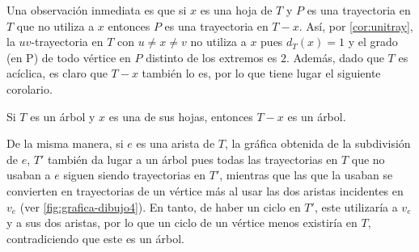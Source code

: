 Una observaci\'on inmediata es que si $x$ es una hoja de $T$ y $P$ es una
trayectoria en $T$ que no utiliza a $x$ entonces $P$ es una trayectoria en
$T-x$. As\'i, por \cref{cor:unitray}, la $uv$-trayectoria en $T$ con $u\neq
x\neq v$ no utiliza a $x$ pues $d_T(x)=1$ y el grado (en P) de todo v\'ertice en
$P$ distinto de los extremos es $2$. Adem\'as, dado que $T$ es ac\'iclica, es
claro que $T-x$ tambi\'en lo es, por lo que tiene lugar el siguiente corolario.

\begin{corolario}
\label{cor:eliminacion-arbol}
  Si $T$ es un \'arbol y $x$ es una de sus hojas, entonces $T-x$ es un \'arbol.
\end{corolario}

De la misma manera, si $e$ es una arista de $T$, la gr\'afica obtenida de la
subdivisi\'on de $e$, $T'$ tambi\'en da lugar a un \'arbol pues todas las
trayectorias en $T$ que no usaban a $e$ siguen siendo trayectorias en $T'$,
mientras que las que la usaban se convierten en trayectorias de un v\'ertice
m\'as al usar las dos aristas incidentes en $v_e$ (ver
\cref{fig:grafica-dibujo4}). En tanto, de haber un ciclo en $T'$, este
utilizar\'ia a $v_e$ y a sus dos aristas, por lo que un ciclo de un v\'ertice
menos existir\'ia en $T$, contradiciendo que este es un \'arbol.


